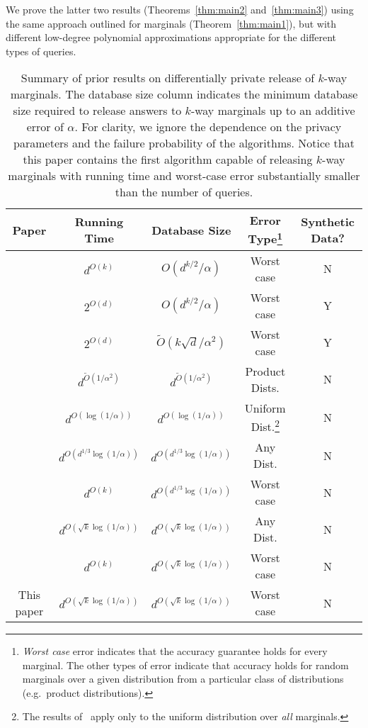 \documentclass[11pt]{article}
\theoremstyle{definition}
\begin{document}
We prove the latter two results (Theorems~\ref{thm:main2} and~\ref{thm:main3}) using the same approach outlined for marginals (Theorem~\ref{thm:main1}), but with different low-degree polynomial approximations appropriate for the different types of queries.
\begin{table}
\begin{minipage}[center]{\textwidth}
\begin{center}
\begin{tabular}{|c|c|c|c|c|}
\hline
Paper & Running Time  & Database Size & Error Type\footnote{\emph{Worst case} error indicates that the accuracy guarantee holds for every marginal.  The other types of error indicate that accuracy holds for random marginals over a given distribution from a particular class of distributions (e.g.~product distributions).} & Synthetic Data? \\
\hline
\cite{DinurNi03,DworkNi04,BlumDwMcNi05,DworkMcNiSm06} &$d^{O(k)}$ & $O(d^{k/2} / \alpha)$ & Worst case & N \\
\cite{BarakChDwKaMcTa07}  & $2^{O(d)}$ & $O(d^{k/2} / \alpha)$ & Worst case & Y \\
\cite{BlumLiRo08,DworkNaReRoVa09,DworkRoVa10,HardtLiMc10}& $2^{O(d)}$ & $\tilde{O}(k\sqrt{d} / \alpha^2)$ & Worst case & Y \\
\cite{GuptaHaRoUl11} & $d^{\tilde{O}(1/\alpha^2)}$ & $d^{\tilde{O}(1/\alpha^2)}$ & Product Dists. & N\\
\cite{CheraghchiKlKoLe12} & $d^{O(\log(1/\alpha))}$ & $d^{O(\log(1/\alpha))}$ & Uniform Dist.\footnote{The results of~\cite{CheraghchiKlKoLe12} apply only to the uniform distribution over \emph{all} marginals.} & N \\
\cite{HardtRoSe12} & $d^{O(d^{1/3}\log(1/\alpha))}$ & $d^{O(d^{1/3}\log(1/\alpha))}$ &Any Dist. & N \\
\cite{HardtRoSe12} & $d^{O(k)}$ & $d^{O(d^{1/3}\log(1/\alpha))}$ & Worst case & N \\
\cite{HardtRoSe12} & $d^{O(\sqrt{k}\log(1/\alpha))}$ & $d^{O(\sqrt{k}\log(1/\alpha))}$ & Any Dist. & N \\
\cite{HardtRoSe12} & $d^{O(k)}$ & $d^{O(\sqrt{k}\log(1/\alpha))}$ & Worst case & N  \\
This paper & $d^{O(\sqrt{k}\log(1/\alpha))}$ & $d^{O(\sqrt{k}\log(1/\alpha))}$& Worst case & N \\
\hline
\end{tabular}
\caption{Summary of prior results on differentially private release of $k$-way marginals.  The database size column indicates the minimum database size required to release answers to $k$-way marginals up to an additive error of $\alpha$.  For clarity, we ignore the dependence on the privacy parameters and the failure probability of the algorithms.  Notice that this paper contains the first algorithm capable of releasing $k$-way marginals with running time and worst-case error substantially smaller than the number of queries.}
\end{center}
\end{minipage}
\end{table}
\end{document}
